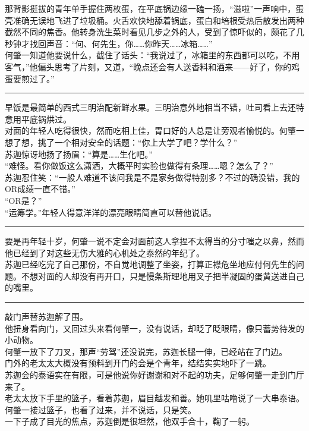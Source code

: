 \documentclass[oneside,11pt]{memoir} %
\begin{document}
\begin{CJK}{UTF8}{gbsn}
    那背影挺拔的青年单手握住两枚蛋，在平底锅边缘一磕一扬，“滋啦”一声响中，蛋壳准确无误地飞进了垃圾桶。火舌欢快地舔着锅底，蛋白和培根受热后散发出两种截然不同的焦香。他转身洗生菜时看见几步之外的人，受到了惊吓似的，颇花了几秒钟才找回声音：“何、何先生，你……你昨天……冰箱……”\\\indent
    何肇一知道他要说什么，截住了话头：“我说过了，冰箱里的东西都可以吃，不用客气，”他偏头思考了片刻，又道，“晚点还会有人送香料和酒来——好了，你的鸡蛋要煎过了。”\\\indent
\rule{-3pt}{30pt}
    早饭是最简单的西式三明治配新鲜水果。三明治意外地相当不错，吐司看上去还特意用平底锅烘过。\\\indent
    对面的年轻人吃得很快，然而吃相上佳，胃口好的人总是让旁观者愉悦的。何肇一想了想，挑了一个相对安全的话题：“你上大学了吧？学什么？”\\\indent
    苏迦惊讶地扬了扬眉：“算是……生化吧。”\\\indent
    “难怪。看你做饭这么潇洒，大概平时实验也做得有条理……嗯？怎么了？”\\\indent
    苏迦忍住笑：“一般人难道不该问我是不是家务做得特别多？不过的确没错，我的OR成绩一直不错。”\\\indent
    “OR是？”\\\indent
    “运筹学。”年轻人得意洋洋的漂亮眼睛简直可以替他说话。\\\indent
  \rule{-3pt}{30pt}  
    要是再年轻十岁，何肇一说不定会对面前这人拿捏不太得当的分寸嗤之以鼻，然而他已经到了对这些无伤大雅的心机处之泰然的年纪了。\\\indent
    苏迦已经吃完了自己那份，不自觉地调整了坐姿，打算正襟危坐地应付何先生的问题。不想对面的人却没有再开口，只是慢条斯理地用叉子把半凝固的蛋黄送进自己的嘴里。\\\indent
\rule{-3pt}{30pt}
    敲门声替苏迦解了围。\\\indent
    他扭身看向门，又回过头来看何肇一，没有说话，却眨了眨眼睛，像只蓄势待发的小动物。\\\indent
    何肇一放下了刀叉，那声“劳驾”还没说完，苏迦长腿一伸，已经站在了门边。\\\indent
    门外的老太太大概没有预料到开门的会是个青年，结结实实地吓了一跳。\\\indent
    苏迦会的泰语实在有限，可是他说你好谢谢和对不起的功夫，足够何肇一走到门厅来了。\\\indent
    老太太放下手里的篮子，看着苏迦，眉目越发和善。她叽里咕噜说了一大串泰语。何肇一接过篮子，也看了过来，并不说话，只是笑。\\\indent
    一下子成了目光的焦点，苏迦倒是很坦然，他双手合十，鞠了一躬。\\\indent

\end{CJK}
\end{document}
